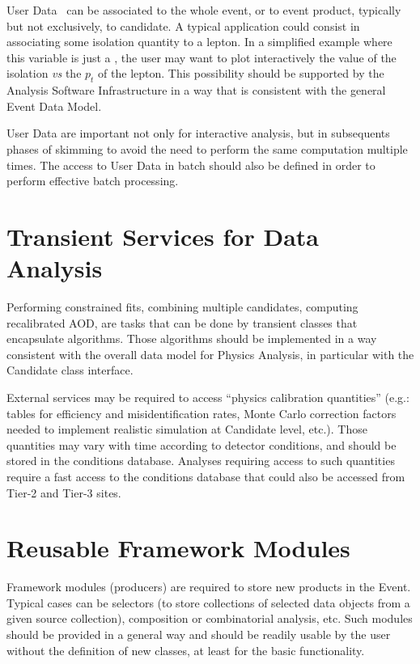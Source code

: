\documentclass[draftmode]{memarticle}
\begin{document}
User Data~\cite{UserData}
can be associated to the whole event, or to event product,
typically but not exclusively, to candidate. 
A typical application could consist in associating 
some isolation quantity to a lepton. In a
simplified example where this variable is just a 
, the user may want to plot 
interactively the value of 
the isolation {\em vs} the $p_t$ of the lepton.
This possibility should be supported by 
the Analysis Software Infrastructure in 
a way that is consistent with the general Event Data Model.

User Data are important not only for interactive analysis,
but in subsequents phases of skimming to avoid the need
to perform the same computation multiple times.
The access to User Data in batch should 
also be defined in order to perform effective
batch processing.

\section{Transient Services for Data Analysis}

Performing constrained fits, combining multiple candidates,
computing recalibrated AOD, are tasks that can be done
by transient classes that encapsulate algorithms.
Those algorithms should be implemented in a way consistent
with the overall data model for Physics Analysis, 
in particular with the Candidate class interface.

External services may be required to access 
``physics calibration quantities''
(e.g.: tables for efficiency and
misidentification rates, Monte Carlo correction factors
needed to implement realistic simulation at Candidate
level, etc.).
Those quantities may vary with time according to 
detector conditions, and should be stored in the 
conditions database.
Analyses requiring access to such quantities 
require a fast access to the conditions database
that could also be accessed from Tier-2 and Tier-3 sites.

\section{Reusable Framework Modules}

Framework modules (producers) are required to store
new products in the Event. Typical cases can be
selectors (to store collections of selected data objects 
from a given source collection), composition or 
combinatorial analysis, etc. 
Such modules should be provided in a general way
and should be readily usable by the user without the
definition of new classes, at least for the basic
functionality.
\end{document}
